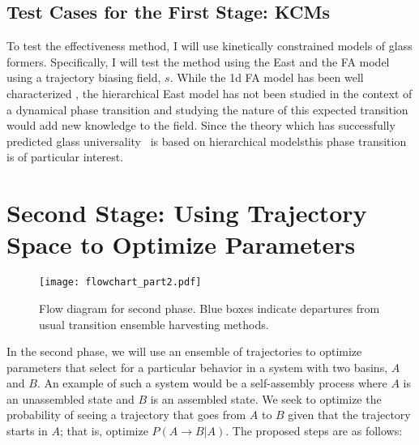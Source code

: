 \documentclass[11pt]{article}
\begin{document}
\subsection*{Test Cases for the First Stage: KCMs}
To test the effectiveness method,  I will use kinetically constrained models of glass formers.  Specifically, I will test the method using the East \cite{Ritort_AdvInPhys_2003} and the FA model using a trajectory biasing field, $s$.  While the 1d FA model has been well characterized \cite{Garrahan_JPhysA_2008, Elmatad_PNAS_2010}, the hierarchical East model has not been studied in the context of a dynamical phase transition and studying the nature of this expected transition would add new knowledge to the field.  Since the theory \cite{Garrahan2003} which has successfully predicted glass universality~\cite{Elmatad2009} is based on hierarchical modelsthis phase transition is of particular interest. 

\section*{Second Stage: Using Trajectory Space to Optimize Parameters}
\begin{figure}[b!] %
   \centering
   \texttt{[image: flowchart\_part2.pdf]} 
   \caption{Flow diagram for second phase.  Blue boxes indicate departures from usual transition ensemble harvesting methods.}
   \label{fig:flow2}
\end{figure}


In the second phase, we will use an ensemble of trajectories to optimize parameters that select for a particular behavior in a system with two basins, $A$ and $B$.  An example of such a system would be a self-assembly process where $A$ is an unassembled state and $B$ is an assembled state.  We seek to optimize the probability of seeing a trajectory that goes from $A$ to $B$ given that the trajectory starts in $A$; that is, optimize $P(A\rightarrow B | A)$.  The proposed steps are as follows: 
\end{document}
